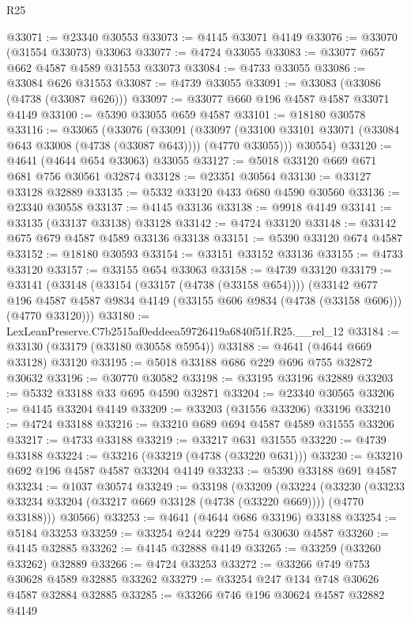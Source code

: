 \begin{lexlean}{R25}
\begin{coremodule}
@33071 := @23340 @30553
@33073 := @4145 @33071 @4149
@33076 := @33070 (@31554 @33073) @33063
@33077 := @4724 @33055
@33083 := @33077 @657 @662 @4587 @4589 @31553 @33073
@33084 := @4733 @33055
@33086 := @33084 @626 @31553
@33087 := @4739 @33055
@33091 := @33083 (@33086 (@4738 (@33087 @626)))
@33097 := @33077 @660 @196 @4587 @4587 @33071 @4149
@33100 := @5390 @33055 @659 @4587
@33101 := @18180 @30578
@33116 := @33065
    (@33076
      (@33091
        (@33097 (@33100 @33101 @33071 (@33084 @643 @33008 (@4738 (@33087 @643)))) (@4770 @33055)))
      @30554)
@33120 := @4641 (@4644 @654 @33063) @33055
@33127 := @5018 @33120 @669 @671 @681 @756 @30561 @32874
@33128 := @23351 @30564
@33130 := @33127 @33128 @32889
@33135 := @5332 @33120 @433 @680 @4590 @30560
@33136 := @23340 @30558
@33137 := @4145 @33136
@33138 := @9918 @4149
@33141 := @33135 (@33137 @33138) @33128
@33142 := @4724 @33120
@33148 := @33142 @675 @679 @4587 @4589 @33136 @33138
@33151 := @5390 @33120 @674 @4587
@33152 := @18180 @30593
@33154 := @33151 @33152 @33136
@33155 := @4733 @33120
@33157 := @33155 @654 @33063
@33158 := @4739 @33120
@33179 := @33141
    (@33148
      (@33154 (@33157 (@4738 (@33158 @654))))
      (@33142
        @677
        @196
        @4587
        @4587
        @9834
        @4149
        (@33155 @606 @9834 (@4738 (@33158 @606)))
        (@4770 @33120)))
@33180 := LexLeanPreserve.C7b2515af0eddeea59726419a6840f51f.R25.__rel_12
@33184 := @33130 (@33179 (@33180 @30558 @5954))
@33188 := @4641 (@4644 @669 @33128) @33120
@33195 := @5018 @33188 @686 @229 @696 @755 @32872 @30632
@33196 := @30770 @30582
@33198 := @33195 @33196 @32889
@33203 := @5332 @33188 @33 @695 @4590 @32871
@33204 := @23340 @30565
@33206 := @4145 @33204 @4149
@33209 := @33203 (@31556 @33206) @33196
@33210 := @4724 @33188
@33216 := @33210 @689 @694 @4587 @4589 @31555 @33206
@33217 := @4733 @33188
@33219 := @33217 @631 @31555
@33220 := @4739 @33188
@33224 := @33216 (@33219 (@4738 (@33220 @631)))
@33230 := @33210 @692 @196 @4587 @4587 @33204 @4149
@33233 := @5390 @33188 @691 @4587
@33234 := @1037 @30574
@33249 := @33198
    (@33209
      (@33224
        (@33230 (@33233 @33234 @33204 (@33217 @669 @33128 (@4738 (@33220 @669)))) (@4770 @33188)))
      @30566)
@33253 := @4641 (@4644 @686 @33196) @33188
@33254 := @5184 @33253
@33259 := @33254 @244 @229 @754 @30630 @4587
@33260 := @4145 @32885
@33262 := @4145 @32888 @4149
@33265 := @33259 (@33260 @33262) @32889
@33266 := @4724 @33253
@33272 := @33266 @749 @753 @30628 @4589 @32885 @33262
@33279 := @33254 @247 @134 @748 @30626 @4587 @32884 @32885
@33285 := @33266 @746 @196 @30624 @4587 @32882 @4149

\end{coremodule}
\end{lexlean}
